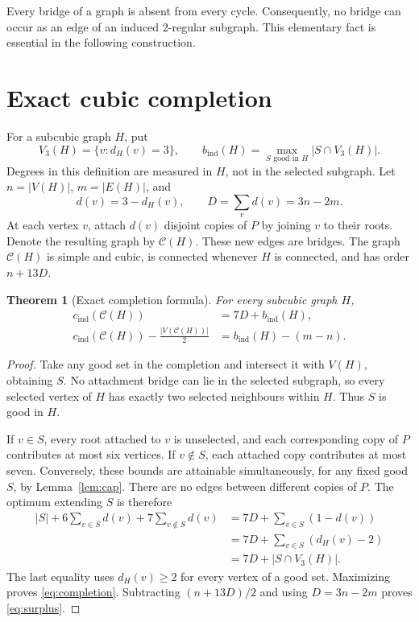 \documentclass[11pt]{article}
\newtheorem{theorem}{Theorem}[section]
\newcommand{\cind}{c_{\mathrm{ind}}}
\newcommand{\bind}{b_{\mathrm{ind}}}
\begin{document}
Every bridge of a graph is absent from every cycle. Consequently, no
bridge can occur as an edge of an induced $2$-regular subgraph.
This elementary fact is essential in the following construction.

\section{Exact cubic completion}
For a subcubic graph $H$, put
\[
 V_3(H)=\{v:d_H(v)=3\},\qquad
 \bind(H)=\max_{S\text{ good in }H}|S\cap V_3(H)|.
\]
Degrees in this definition are measured in $H$, not in the selected
subgraph. Let $n=|V(H)|$, $m=|E(H)|$, and
\[
 d(v)=3-d_H(v),\qquad D=\sum_v d(v)=3n-2m.
\]
At each vertex $v$, attach $d(v)$ disjoint copies of $P$ by joining
$v$ to their roots. Denote the resulting graph by $\mathcal C(H)$.
These new edges are bridges. The graph $\mathcal C(H)$ is simple and
cubic, is connected whenever $H$ is connected, and has order $n+13D$.

\begin{theorem}[Exact completion formula]\label{thm:completion}
For every subcubic graph $H$,
\begin{align}
 \cind(\mathcal C(H))&=7D+\bind(H),\label{eq:completion}\\
 \cind(\mathcal C(H))-\frac{|V(\mathcal C(H))|}{2}
   &=\bind(H)-(m-n).\label{eq:surplus}
\end{align}
\end{theorem}
\begin{proof}
Take any good set in the completion and intersect it with $V(H)$,
obtaining $S$. No attachment bridge can lie in the selected subgraph,
so every selected vertex of $H$ has exactly two selected neighbours
within $H$. Thus $S$ is good in $H$.

If $v\in S$, every root attached to $v$ is unselected, and each
corresponding copy of $P$ contributes at most six vertices.
If $v\notin S$, each attached copy contributes at most seven.
Conversely, these bounds are attainable simultaneously, for any
fixed good $S$, by Lemma~\ref{lem:cap}. There are no edges between
different copies of $P$. The optimum extending $S$ is therefore
\begin{align*}
 |S|+6\sum_{v\in S}d(v)+7\sum_{v\notin S}d(v)
 &=7D+\sum_{v\in S}(1-d(v))\\
 &=7D+\sum_{v\in S}(d_H(v)-2)\\
 &=7D+|S\cap V_3(H)|.
\end{align*}
The last equality uses $d_H(v)\geq2$ for every vertex of a good set.
Maximizing proves \eqref{eq:completion}. Subtracting $(n+13D)/2$
and using $D=3n-2m$ proves \eqref{eq:surplus}.
\end{proof}
\end{document}
